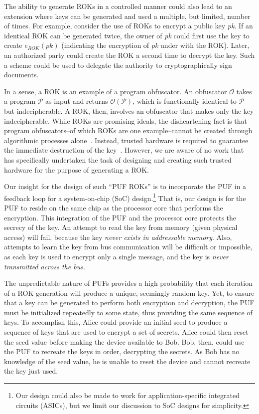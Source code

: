 The ability to generate ROKs in a controlled manner could also lead to an extension where keys can be generated and used
a multiple, but limited, number of times. For example, consider the use of ROKs to encrypt a public key {\it pk}. If an
identical ROK can be generated twice, the owner of {\it pk} could first use the key to create $e_{ROK}(pk)$ (indicating the
encryption of {\it pk} under with the ROK). Later, an authorized party could create the ROK a second time to decrypt the
key. Such a scheme could be used to delegate the authority to cryptographically sign documents.

In a sense, a ROK is an example of a program obfuscator.  An obfuscator $\mathcal{O}$ takes a program $\mathcal{P}$ as
input and returns $\mathcal{O}(\mathcal{P})$, which is functionally identical to $\mathcal{P}$ but indecipherable.  A ROK,
then, involves an obfuscator that makes only the key indecipherable.  While ROKs are promising ideals, the
disheartening fact is that program obfuscators--of which ROKs are one example--cannot be created through algorithmic
processes alone~\cite{impobf}.  Instead, trusted hardware is required to guarantee the immediate destruction of the
key~\cite{otp}.  However, we are aware of no work that has specifically undertaken the task of designing and creating such
trusted hardware for the purpose of generating a ROK.

Our insight for the design of such ``PUF ROKs'' is to incorporate the PUF in a feedback loop for a system-on-chip
(SoC) design.\footnote{Our design could also be made to work for application-specific integrated circuits (ASICs), but
we limit our discussion to SoC designs for simplicity.} That is, our design is for the PUF to reside on the same chip
as the processor core that performs the encryption. This integration of the PUF and the processor core protects the
secrecy of the key.  An attempt to read the key from memory (given physical access) will fail, because the key \emph{never
exists in addressable memory}.  Also, attempts to learn the key from bus communication will be difficult or
impossible, as each key is used to encrypt only a single message, and the key is \emph{never transmitted across the bus}.

The unpredictable nature of PUFs provides a high probability that each iteration of a ROK generation will produce a
unique, seemingly random key.  Yet, to ensure that a key can be generated to perform both encryption and decryption,
the PUF must be initialized repeatedly to some state, thus providing the same 
sequence of keys.  To accomplish this, Alice could provide an initial seed to produce a sequence of keys that are used to encrypt
a set of secrets. Alice could then reset the seed value before making the device available to Bob. Bob, then, could use the PUF to
recreate the keys in order, decrypting the secrets. As Bob has no knowledge of the seed value, he is unable to reset the
device and cannot recreate the key just used.

